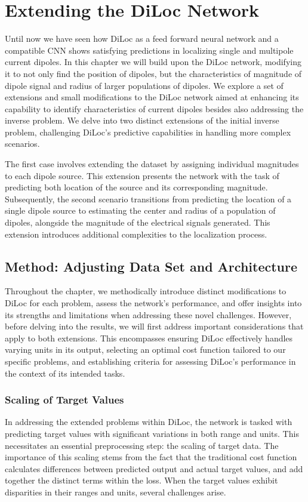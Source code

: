 \documentclass[a4paper, UKenglish, 11pt]{uiomaster}
\begin{document}
\chapter{Extending the DiLoc Network}
Until now we have seen how DiLoc as a feed forward neural network and a compatible CNN shows satisfying predictions in localizing single and multipole current dipoles. In this chapter we will build upon the DiLoc network, modifying it to not only find the position of dipoles, but the characteristics of magnitude of dipole signal and radius of larger populations of dipoles. We explore a set of extensions and small modifications to the DiLoc network aimed at enhancing its capability to identify characteristics of current dipoles besides also addressing the inverse problem. We delve into two distinct extensions of the initial inverse problem, challenging DiLoc's predictive capabilities in handling more complex scenarios.

The first case involves extending the dataset by assigning individual magnitudes to each dipole source. This extension presents the network with the task of predicting both location of the source and its corresponding magnitude. Subsequently, the second scenario transitions from predicting the location of a single dipole source to estimating the center and radius of a population of dipoles, alongside the magnitude of the electrical signals generated. This extension introduces additional complexities to the localization process.

\section{Method: Adjusting Data Set and Architecture}
Throughout the chapter, we methodically introduce distinct modifications to DiLoc for each problem, assess the network's performance, and offer insights into its strengths and limitations when addressing these novel challenges. However, before delving into the results, we will first address important considerations that apply to both extensions. This encompasses ensuring DiLoc effectively handles varying units in its output, selecting an optimal cost function tailored to our specific problems, and establishing criteria for assessing DiLoc's performance in the context of its intended tasks.

\subsection{Scaling of Target Values}
In addressing the extended problems within DiLoc, the network is tasked with predicting target values with significant variations in both range and units. This necessitates an essential preprocessing step: the scaling of target data. The importance of this scaling stems from the fact that the traditional cost function calculates differences between predicted output and actual target values, and add together the distinct terms within the loss. When the target values exhibit disparities in their ranges and units, several challenges arise.
\end{document}
